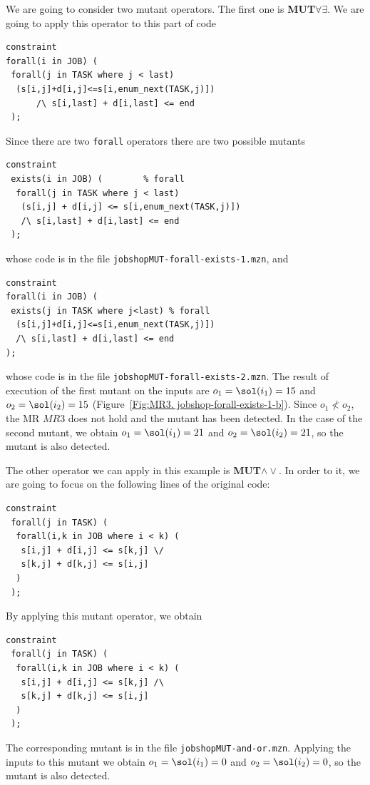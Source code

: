 We are going to consider two mutant operators. The first one is
\textbf{MUT$\forall\exists$}. We are going to apply
this operator to this part of code
\begin{lstlisting}
constraint
forall(i in JOB) (
 forall(j in TASK where j < last)
  (s[i,j]+d[i,j]<=s[i,enum_next(TASK,j)])
      /\ s[i,last] + d[i,last] <= end
 );
\end{lstlisting}
Since there are two \lstinline|forall| operators there are two
possible mutants
\begin{lstlisting}
constraint
 exists(i in JOB) (        % forall
  forall(j in TASK where j < last)
   (s[i,j] + d[i,j] <= s[i,enum_next(TASK,j)]) 
   /\ s[i,last] + d[i,last] <= end
 );
\end{lstlisting}
whose code is in the file \lstinline|jobshopMUT-forall-exists-1.mzn|,
and
\begin{lstlisting}
constraint
forall(i in JOB) (
 exists(j in TASK where j<last) % forall
  (s[i,j]+d[i,j]<=s[i,enum_next(TASK,j)]) 
  /\ s[i,last] + d[i,last] <= end
);
\end{lstlisting}
whose code is in the file \lstinline|jobshopMUT-forall-exists-2.mzn|.
The result of execution of the first mutant on the inputs are
$o_{1}=\sol(i_{1})=15$ and $o_{2}=\sol(i_{2})=15$
(Figure~\ref{Fig:MR3. jobshop-forall-exists-1-b}). Since $o_{1}\not<
o_{2}$, the MR $MR3$ does not hold and the mutant has
been detected. In the case of the second mutant, we obtain
$o_{1}=\sol(i_{1})=21$ and $o_{2}=\sol(i_{2})=21$, so the mutant is
also detected.

The other operator we can apply in this example is
\textbf{MUT$\wedge\vee$}. In order to it, we are going to focus on the
following
lines of the original code:
\begin{lstlisting}
constraint
 forall(j in TASK) (
  forall(i,k in JOB where i < k) (
   s[i,j] + d[i,j] <= s[k,j] \/
   s[k,j] + d[k,j] <= s[i,j]
  )
 );
\end{lstlisting}
By applying this mutant operator, we obtain
\begin{lstlisting}
constraint
 forall(j in TASK) (
  forall(i,k in JOB where i < k) (
   s[i,j] + d[i,j] <= s[k,j] /\
   s[k,j] + d[k,j] <= s[i,j]
  )
 );
\end{lstlisting}
The corresponding mutant is in the file
\lstinline|jobshopMUT-and-or.mzn|. Applying the inputs to this mutant
we obtain $o_{1}=\sol(i_{1})=0$ and $o_{2}=\sol(i_{2})=0$, so the mutant is
also detected.


